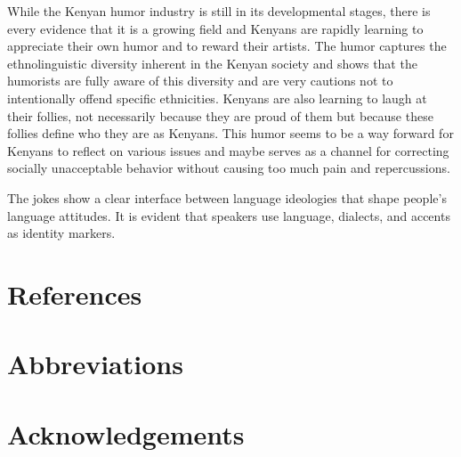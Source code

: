 \documentclass[output=paper]{langsci/langscibook}
\begin{document}
   While the Kenyan humor industry is still in its developmental stages, there is every evidence that it is a growing field and Kenyans are rapidly learning to appreciate their own humor and to reward their artists. The humor captures the ethnolinguistic diversity inherent in the Kenyan society and shows that the humorists are fully aware of this diversity and are very cautions not to intentionally offend specific ethnicities. Kenyans are also learning to laugh at their follies, not necessarily because they are proud of them but because these follies define who they are as Kenyans. This humor seems to be a way forward for Kenyans to reflect on various issues and maybe serves as a channel for correcting socially unacceptable behavior without causing too much pain and repercussions.

   The jokes show a clear interface between language ideologies that shape people’s language attitudes. It is evident that speakers use language, dialects, and accents as identity markers. \\

\section{References }

 

\section*{Abbreviations}
\section*{Acknowledgements}

\printbibliography[heading=subbibliography,notkeyword=this]
\end{document}
